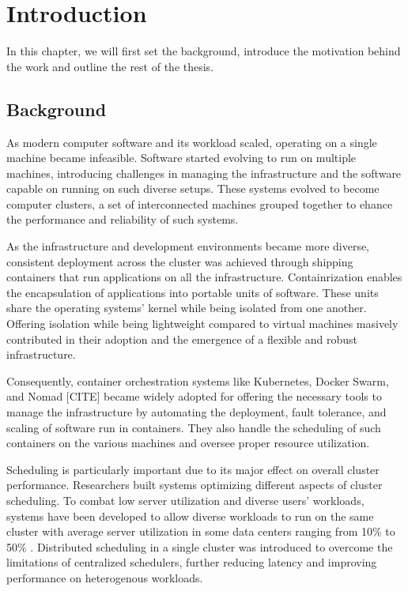 
\chapter{Introduction} 

In this chapter, we will first set the background, introduce the motivation
behind the work and outline the rest of the thesis.  

\section{Background}
As modern computer software and its workload scaled, operating on a single
machine became infeasible. Software started evolving to run on multiple
machines, introducing challenges in managing the infrastructure and the
software capable on running on such diverse setups. These systems evolved to
become computer clusters, a set of interconnected machines grouped together to
ehance the performance and reliability of such systems. 

As the infrastructure and development environments became more diverse,
consistent deployment across the cluster was achieved through shipping
containers that run applications on all the infrastructure. Containrization
enables the encapsulation of applications into portable units of software.
These units share the operating systems' kernel while being isolated from one
another. Offering isolation while being lightweight compared to virtual
machines masively contributed in their adoption and the emergence of a flexible
and robust infrastructure. 

Consequently, container orchestration systems like Kubernetes, Docker Swarm, and
Nomad [CITE] became widely adopted for offering the necessary tools to manage
the infrastructure by automating the deployment, fault tolerance, and scaling
of software run in containers. They also handle the scheduling of such
containers on the various machines and oversee proper resource utilization.  

Scheduling is particularly important due to its major effect on overall
cluster performance. Researchers built systems optimizing different aspects of
cluster scheduling. To combat low server utilization and diverse users'
workloads, systems have been developed to allow diverse workloads to run on the
same cluster \cite{bhattacharya_hierarchical_2013, hindman_mesos_nodate} with
average server utilization in some data centers ranging from 10\% to 50\%
\cite{lo_heracles_2015}. Distributed scheduling in a single cluster was
introduced to overcome the limitations of centralized schedulers, further
reducing latency and improving performance on heterogenous workloads. 


